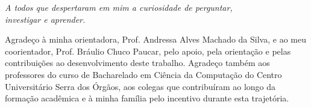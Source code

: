 \documentclass[
	12pt,				%
	openright,			%
	oneside,			%
	a4paper,			%
	chapter=TITLE,		%
	section=TITLE,		%
	subsection=TITLE,	%
	subsubsection=TITLE,%
	english,			%
	brazilian			%
	]{abntex2}
\theoremstyle{definition}
\begin{document}
\hypersetup{pageanchor=false}


\frenchspacing 



\imprimircapa

\imprimirfolhaderosto


%    


\newpage

%
\begin{folhadeaprovacao}
\imprimirfolhadeaprovacao
\end{folhadeaprovacao}





\begin{dedicatoria}
   \vspace*{\fill}
   \flushright
   \textit{A todos que despertaram em mim a curiosidade de perguntar,\\
   investigar e aprender.}
\end{dedicatoria}

\begin{agradecimentos}

Agradeço à minha orientadora, Prof. Andressa Alves Machado da Silva, e ao meu coorientador, Prof. Bráulio Chuco Paucar, pelo apoio, pela orientação e pelas contribuições ao desenvolvimento deste trabalho. Agradeço também aos professores do curso de Bacharelado em Ciência da Computação do Centro Universitário Serra dos Órgãos, aos colegas que contribuíram ao longo da formação acadêmica e à minha família pelo incentivo durante esta trajetória.

\end{agradecimentos}
\end{document}
